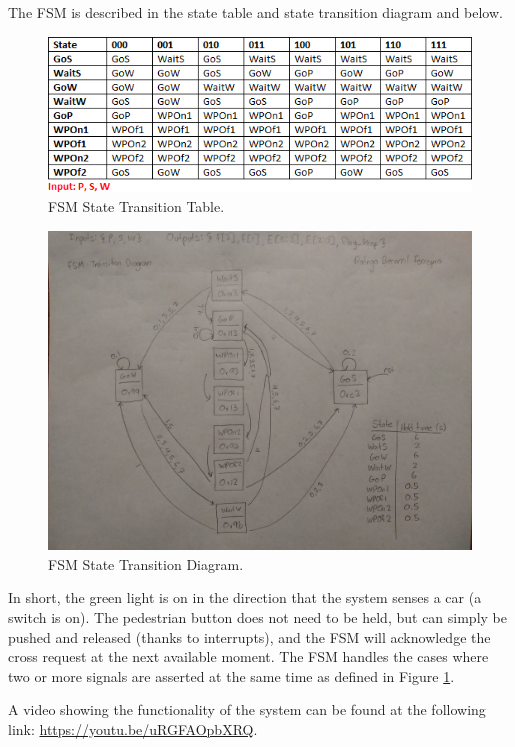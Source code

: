 \documentclass{article}
\begin{document}
The FSM is described in the state table and
state transition diagram and
below.
\begin{figure}[H]
    \centering
    \includegraphics[width=\textwidth]{Images/statetable}
    \caption{FSM State Transition Table.}
    \label{fsm:table}
\end{figure}

\begin{figure}[H]
    \centering
    \includegraphics[width=\textwidth]{Images/statediagram}
    \caption{FSM State Transition Diagram.}
    \label{fsm:diagram}
\end{figure}

In short, the green light is on in the direction that
the system senses a car (a switch is on). The pedestrian
button does not need to be held, but can simply be pushed and
released
(thanks to interrupts),
and the FSM will acknowledge the cross request
at the next available moment. The FSM handles the cases where
two or more signals are asserted at the same time as defined
in Figure \ref{fsm:table}.

A video showing the functionality of the system can
be found at the following link:
\url{https://youtu.be/uRGFAOpbXRQ}.
\end{document}
